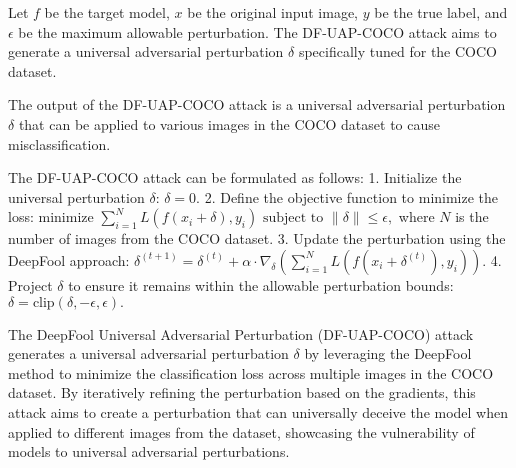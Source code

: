 Let \( f \) be the target model, \( x \) be the original input image, \( y \) be the true label, and \( \epsilon \) be the maximum allowable perturbation. The DF-UAP-COCO attack aims to generate a universal adversarial perturbation \( \delta \) specifically tuned for the COCO dataset.

The output of the DF-UAP-COCO attack is a universal adversarial perturbation \( \delta \) that can be applied to various images in the COCO dataset to cause misclassification.

The DF-UAP-COCO attack can be formulated as follows:
1. Initialize the universal perturbation \( \delta \):
   $
   \delta = 0.
   $
2. Define the objective function to minimize the loss:
   $
   \text{minimize } \sum_{i=1}^{N} L(f(x_i + \delta), y_i) \text{ subject to } \|\delta\| \leq \epsilon,
   $
   where \( N \) is the number of images from the COCO dataset.
3. Update the perturbation using the DeepFool approach:
   $
   \delta^{(t+1)} = \delta^{(t)} + \alpha \cdot \nabla_{\delta} \left( \sum_{i=1}^{N} L(f(x_i + \delta^{(t)}), y_i) \right).
   $
4. Project \( \delta \) to ensure it remains within the allowable perturbation bounds:
   $
   \delta = \text{clip}(\delta, -\epsilon, \epsilon).
   $

The DeepFool Universal Adversarial Perturbation (DF-UAP-COCO) attack generates a universal adversarial perturbation \( \delta \) by leveraging the DeepFool method to minimize the classification loss across multiple images in the COCO dataset. By iteratively refining the perturbation based on the gradients, this attack aims to create a perturbation that can universally deceive the model when applied to different images from the dataset, showcasing the vulnerability of models to universal adversarial perturbations.
